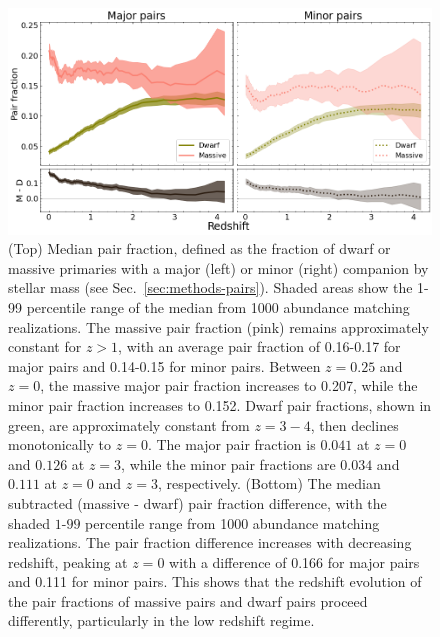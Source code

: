 \documentclass[twocolumn]{aastex631}
\begin{document}
\label{sec:results}
\begin{figure}[htp]
  \centering
  \includegraphics[width=\textwidth]{pairfrac_1000.png}
  \caption{
    (Top) Median pair fraction, defined as the fraction of dwarf or massive primaries with a major (left) or minor (right) companion by stellar mass (see Sec.~\ref{sec:methods-pairs}). 
    Shaded areas show the 1-99 percentile range of the median from 1000 abundance matching realizations. 
    The massive pair fraction (pink) remains approximately constant for $z>1$, with an average pair fraction of 0.16-0.17 for major pairs and 0.14-0.15 for minor pairs. Between $z=0.25$ and $z=0$, the massive major pair fraction increases to 0.207, while the minor pair fraction increases to 0.152.
    Dwarf pair fractions, shown in green, are approximately constant from $z=3-4$, then declines monotonically to $z=0$. The major pair fraction is $0.041$ at $z=0$ and $0.126$ at $z=3$, while the minor pair fractions are $0.034$ and $0.111$ at $z=0$ and $z=3$, respectively. 
    (Bottom) The median subtracted (massive - dwarf) pair fraction difference, with the shaded $1$-$99$ percentile range from 1000 abundance matching realizations. The pair fraction difference increases with decreasing redshift, peaking at $z=0$ with a difference of 0.166 for major pairs and 0.111 for minor pairs. This shows that the redshift evolution of the pair fractions of massive pairs and dwarf pairs proceed differently, particularly in the low redshift regime.}
  \label{fig:pairratio}
\end{figure}

\end{document}
